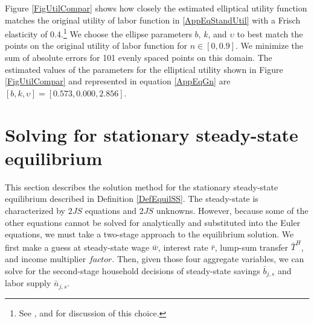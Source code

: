 \documentclass[letterpaper,12pt]{article}
\theoremstyle{definition}
\renewcommand\theenumi{\roman{enumi}}
\begin{document}
  Figure \ref{FigUtilCompar} shows how closely the estimated elliptical utility function matches the original utility of labor function in \eqref{AppEqStandUtil} with a Frisch elasticity of 0.4.\footnote{See \citet{Chetty:2011}, \citet{KeaneRogerson:2012} and \citet{Peterman:2014} for discussion of this choice.} We choose the ellipse parameters $b$, $k$, and $\upsilon$ to best match the points on the original utility of labor function for $n\in[0,0.9]$. We minimize the sum of absolute errors for 101 evenly spaced points on this domain. The estimated values of the parameters for the elliptical utility shown in Figure \ref{FigUtilCompar} and represented in equation \eqref{AppEqGn} are $[b,k,\upsilon] = [0.573,0.000,2.856]$.

  \clearpage


\newpage
\section{Solving for stationary steady-state equilibrium}\label{AppSSsolve}

  \setcounter{equation}{0}
  \renewcommand\theenumi{\arabic{enumi}}
  \renewcommand\theenumii{\alph{enumii}}
  \renewcommand\theenumiii{\roman{enumiii}}

  This section describes the solution method for the stationary steady-state equilibrium described in Definition \ref{DefEquilSS}. The steady-state is characterized by $2JS$ equations and $2JS$ unknowns. However, because some of the other equations cannot be solved for analytically and substituted into the Euler equations, we must take a two-stage approach to the equilibrium solution. We first make a guess at steady-state wage $\bar{w}$, interest rate $\bar{r}$, lump-sum transfer $\bar{T}^H$, and income multiplier $factor$. Then, given those four aggregate variables, we can solve for the second-stage household decisions of steady-state savings $\bar{b}_{j,s}$ and labor supply $\bar{n}_{j,s}$.
\end{document}
